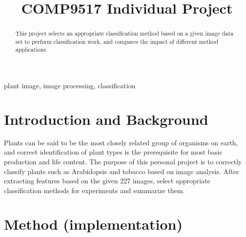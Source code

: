 \documentclass[conference]{IEEEtran}
\begin{document}
\title{COMP9517 Individual Project}

\author{
}

\maketitle

\begin{abstract}
This project selects an appropriate classification method based on a given image data set to perform classification work, and compares the impact of different method applications.
\end{abstract}

\begin{IEEEkeywords}
plant image, image processing, classification 
\end{IEEEkeywords}

\section{Introduction and Background}
Plants can be said to be the most closely related group of organisms on earth, and correct identification of plant types is the prerequisite for most basic production and life content. The purpose of this personal project is to correctly classify plants such as Arabidopsis and tobacco based on image analysis. After extracting features based on the given 227 images, select appropriate classification methods for experiments and summarize them.
\section{Method (implementation)}
\end{document}
